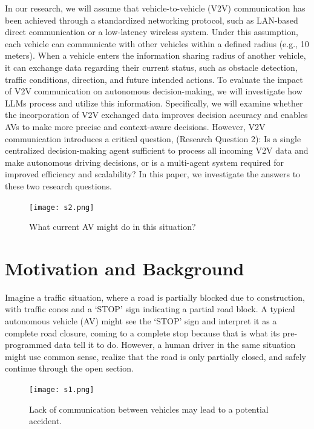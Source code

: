 \documentclass[conference]{IEEEtran}
\begin{document}
In our research, we will assume that vehicle-to-vehicle (V2V) communication has been achieved through a standardized networking protocol, such as LAN-based direct communication or a low-latency wireless system. Under this assumption, each vehicle can communicate with other vehicles within a defined radius (e.g., 10 meters). When a vehicle enters the information sharing radius of another vehicle, it can exchange data regarding their current status, such as obstacle detection, traffic conditions, direction, and future intended actions.
To evaluate the impact of V2V communication on autonomous decision-making, we will investigate how LLMs process and utilize this information. Specifically, we will examine whether the incorporation of V2V exchanged data improves decision accuracy and enables AVs to make more precise and context-aware decisions.
However, V2V communication introduces a critical question, (Research Question 2): Is a single centralized decision-making agent sufficient to process all incoming V2V data and make autonomous driving decisions, or is a multi-agent system required for improved efficiency and scalability? In this paper, we investigate the answers to these two research questions. 


\begin{figure}[!h]
    \centering
    \texttt{[image: s2.png]}
    \caption{What current AV might do in this situation?}
    \label{fig:enter-label-unique}
\end{figure}
\section{Motivation and Background}

Imagine a traffic situation, where a road is partially blocked due to construction, with traffic cones and a `STOP' sign indicating a partial road block. A typical autonomous vehicle (AV) might see the `STOP' sign and interpret it as a complete road closure, coming to a complete stop because that is what its pre-programmed data tell it to do. However, a human driver in the same situation might use common sense, realize that the road is only partially closed, and safely continue through the open section.

\begin{figure}[ht]
    \centering
    \texttt{[image: s1.png]}
    \caption{Lack of communication between vehicles may lead to a potential accident.}
    \label{fig:enter-label-unique-2}
\end{figure}
\end{document}
